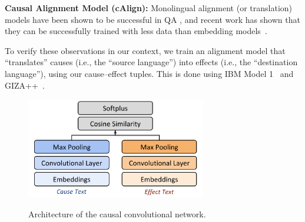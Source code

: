 {\flushleft \textbf{Causal Alignment Model (cAlign):}}
Monolingual alignment (or translation) models have been shown to be successful in QA \cite{Berger:00,Echihabi:03,Soricut:06,Riezler:etal:2007,Surdeanu:11,yao2013}, and recent work has shown that they can be successfully trained with less data than embedding models~\cite{sharp2015spinning}. 

To verify these observations in our context, we train an alignment model that ``translates'' causes (i.e., the ``source language'') into effects (i.e., the ``destination language''), using our cause--effect tuples. 
This is done using IBM Model 1~\cite{Brown:93} and GIZA++~\cite{och03}. 


\begin{figure}[t!]
\begin{center}
\includegraphics[width=0.7\textwidth]{mainmatter/emnlp2016-causal/cnn2.png}
\vspace{-2mm}
\caption{{\footnotesize Architecture of the causal convolutional network. }}
\vspace{-6mm}
\label{fig:cnn}
\end{center}
\end{figure}

